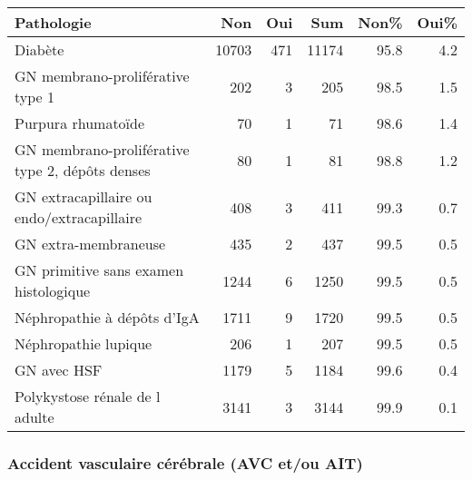 \documentclass[11pt,a4paper]{article}\usepackage[]{graphicx}\usepackage[]{color}
\begin{document}
\begin{table}[H]
\centering
\begin{tabular}{lrrrrr}
  \hline
Pathologie & Non & Oui & Sum & Non\% & Oui\% \\ 
  \hline
Diabète & 10703 & 471 & 11174 & 95.8 & 4.2 \\ 
  GN membrano-proliférative type 1 & 202 &  3 & 205 & 98.5 & 1.5 \\ 
  Purpura rhumatoïde & 70 &  1 & 71 & 98.6 & 1.4 \\ 
  GN membrano-proliférative type 2, dépôts denses & 80 &  1 & 81 & 98.8 & 1.2 \\ 
  GN extracapillaire ou endo/extracapillaire & 408 &  3 & 411 & 99.3 & 0.7 \\ 
  GN extra-membraneuse & 435 &  2 & 437 & 99.5 & 0.5 \\ 
  GN primitive sans examen histologique & 1244 &  6 & 1250 & 99.5 & 0.5 \\ 
  Néphropathie à dépôts d'IgA & 1711 &  9 & 1720 & 99.5 & 0.5 \\ 
  Néphropathie lupique & 206 &  1 & 207 & 99.5 & 0.5 \\ 
  GN avec HSF & 1179 &  5 & 1184 & 99.6 & 0.4 \\ 
  Polykystose rénale de l adulte & 3141 &  3 & 3144 & 99.9 & 0.1 \\ 
   \hline
\end{tabular}
\end{table}


\subsubsection*{Accident vasculaire cérébrale (AVC et/ou AIT)}
\end{document}
